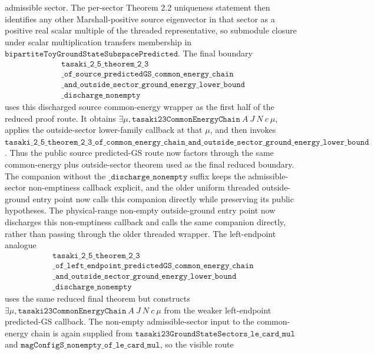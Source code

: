 \documentclass[a4paper,11pt]{article}
\begin{document}
admissible sector.  The per-sector Theorem 2.2 uniqueness statement then
identifies any other Marshall-positive source eigenvector in that sector as
a positive real scalar multiple of the threaded representative, so
submodule closure under scalar multiplication transfers membership in
\(\texttt{bipartiteToyGroundStateSubspacePredicted}\).
The final boundary
\[
\begin{gathered}
\texttt{tasaki\_2\_5\_theorem\_2\_3}\\
\texttt{\_of\_source\_predictedGS\_common\_energy\_chain}\\
\texttt{\_and\_outside\_sector\_ground\_energy\_lower\_bound}\\
\texttt{\_discharge\_nonempty}
\end{gathered}
\]
uses this discharged source common-energy wrapper as the first half of
the reduced proof route.  It obtains
\(\exists\mu,\texttt{tasaki23CommonEnergyChain}~A~J~N~c~\mu\), applies
the outside-sector lower-family callback at that \(\mu\), and then
invokes
\(\texttt{tasaki\_2\_5\_theorem\_2\_3\_of\_common\_energy\_chain\_and\_outside\_sector\_ground\_energy\_lower\_bound}\).
Thus the public source predicted-GS route now factors through the same
common-energy plus outside-sector theorem used as the final reduced
boundary.
The companion without the \(\texttt{\_discharge\_nonempty}\) suffix keeps the
admissible-sector non-emptiness callback explicit, and the older uniform
threaded outside-ground entry point now calls this companion directly while
preserving its public hypotheses.
The physical-range non-empty outside-ground entry point now discharges this
non-emptiness callback and calls the same companion directly, rather than
passing through the older threaded wrapper.
The left-endpoint analogue
\[
\begin{gathered}
\texttt{tasaki\_2\_5\_theorem\_2\_3}\\
\texttt{\_of\_left\_endpoint\_predictedGS\_common\_energy\_chain}\\
\texttt{\_and\_outside\_sector\_ground\_energy\_lower\_bound}\\
\texttt{\_discharge\_nonempty}
\end{gathered}
\]
uses the same reduced final theorem but constructs
\(\exists\mu,\texttt{tasaki23CommonEnergyChain}~A~J~N~c~\mu\) from the
weaker left-endpoint predicted-GS callback.  The non-empty admissible-sector
input to the common-energy chain is again supplied from
\(\texttt{tasaki23GroundStateSectors\_le\_card\_mul}\) and
\(\texttt{magConfigS\_nonempty\_of\_le\_card\_mul}\), so the visible route
\end{document}
